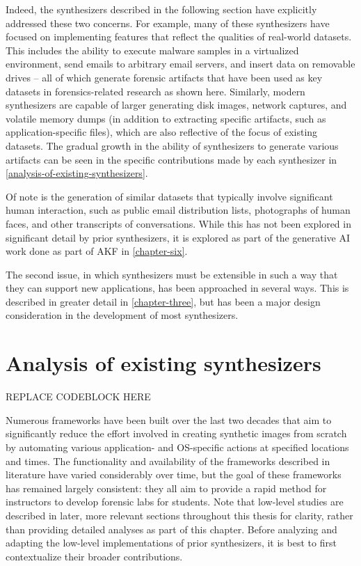 \documentclass[letterpaper,12pt]{report}
\begin{document}
Indeed, the synthesizers described in the following section have
explicitly addressed these two concerns. For example, many of these
synthesizers have focused on implementing features that reflect the
qualities of real-world datasets. This includes the ability to execute
malware samples in a virtualized environment, send emails to arbitrary
email servers, and insert data on removable drives -- all of which
generate forensic artifacts that have been used as key datasets in
forensics-related research as shown here. Similarly, modern synthesizers
are capable of larger generating disk images, network captures, and
volatile memory dumps (in addition to extracting specific artifacts,
such as application-specific files), which are also reflective of the
focus of existing datasets. The gradual growth in the ability of
synthesizers to generate various artifacts can be seen in the specific
contributions made by each synthesizer in \autoref{analysis-of-existing-synthesizers}.

Of note is the generation of similar datasets that typically involve
significant human interaction, such as public email distribution lists,
photographs of human faces, and other transcripts of conversations.
While this has not been explored in significant detail by prior
synthesizers, it is explored as part of the generative AI work done as
part of AKF in \autoref{chapter-six}.

The second issue, in which synthesizers must be extensible in such a way
that they can support new applications, has been approached in several
ways. This is described in greater detail in \autoref{chapter-three}, but has been a major design consideration in the
development of most synthesizers.

\section{Analysis of existing
synthesizers}\label{analysis-of-existing-synthesizers}

REPLACE CODEBLOCK HERE

Numerous frameworks have been built over the last two decades that aim
to significantly reduce the effort involved in creating synthetic images
from scratch by automating various application- and OS-specific actions
at specified locations and times. The functionality and availability of
the frameworks described in literature have varied considerably over
time, but the goal of these frameworks has remained largely consistent:
they all aim to provide a rapid method for instructors to develop
forensic labs for students. Note that low-level studies are described in
later, more relevant sections throughout this thesis for clarity, rather
than providing detailed analyses as part of this chapter. Before
analyzing and adapting the low-level implementations of prior
synthesizers, it is best to first contextualize their broader
contributions.
\end{document}
